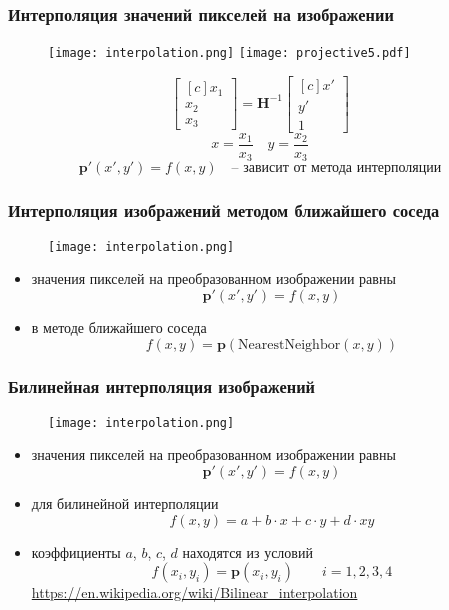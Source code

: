 \documentclass[
    12pt, 
    usepdftitle=false,
    aspectratio=1610
]{beamer}
\begin{document}
\begin{frame}
    \frametitle{Интерполяция значений пикселей на изображении}
    \begin{figure}[t]
        \texttt{[image: interpolation.png]}
        \hspace{1cm}
        \texttt{[image: projective5.pdf]}
    \end{figure}
    $$
        \begin{bmatrix*}[c]
            x_1 \\ x_2 \\ x_3    
        \end{bmatrix*}=
        \mathbf{H}^{-1}
        \begin{bmatrix*}[c]
            x' \\ y' \\ 1    
        \end{bmatrix*}
    $$
    $$
        x=\frac{x_1}{x_3}\quad
        y=\frac{x_2}{x_3}
    $$
    $$
        \mathbf{p}'(x',y')=f(x,y) 
        \quad\mbox{-- зависит от метода интерполяции}
    $$
\end{frame}

\begin{frame}
    \frametitle{Интерполяция изображений методом ближайшего соседа}
    \begin{figure}[t]
        \texttt{[image: interpolation.png]}
    \end{figure}
    \begin{itemize}
        \item значения пикселей на преобразованном изображении равны
        $$
            \mathbf{p}'\left(x',y'\right)=f(x,y)
        $$
        \item в методе ближайшего соседа
        $$
            f(x,y)=\mathbf{p}\left(\mathrm{NearestNeighbor}(x,y)\right)
        $$
    \end{itemize}
\end{frame}

\begin{frame}
    \frametitle{Билинейная интерполяция изображений}
    \begin{figure}[t]
        \texttt{[image: interpolation.png]}
    \end{figure}
    \begin{itemize}
        \item значения пикселей на преобразованном изображении равны
        $$
            \mathbf{p}'\left(x',y'\right)=f(x,y)
        $$
        \item для билинейной интерполяции
        $$
            f(x,y)=a+b\cdot x+c\cdot y+d\cdot xy
        $$
        \item коэффициенты $a$, $b$, $c$, $d$ находятся из условий
        $$
            f(x_i,y_i)=\mathbf{p}(x_i, y_i)\qquad i=1,2,3,4
        $$
        \url{https://en.wikipedia.org/wiki/Bilinear_interpolation}
    \end{itemize}
\end{frame}
\end{document}
